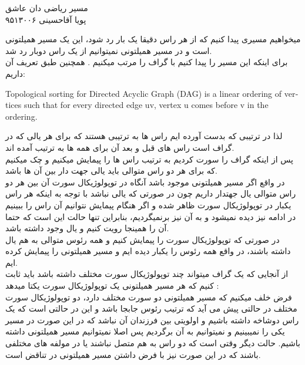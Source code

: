 \documentclass[11pt]{letter}
\begin{document}
	\begin{center}
		{\huge مسیر ریاضی دان عاشق}\\
		{ پویا آقاحسینی ۹۵۱۳۰۰۶}
	\end{center}
	\begin{RTL}
		میخواهیم مسیری پیدا کنیم که از هر راس دقیقا یک بار رد شود، این یک مسیر همیلتونی است و در مسیر همیلتونی نمیتوانیم از یک راس دوبار رد شد.\\
		برای اینکه این مسیر را پیدا کنیم با 
		گراف را مرتب میکنیم .
		همچنین طبق تعریف آن داریم:\\

\begin{latin}
				Topological sorting for Directed Acyclic Graph (DAG) is a linear ordering of vertices such that for every directed edge uv, vertex u comes before v in the ordering.
\end{latin}
		
	لذا در ترتیبی که بدست آورده ایم راس ها به ترتیبی هستند که برای هر یالی که در گراف است راس های قبل و بعد آن برای همه 
		ها به ترتیب آمده اند.\\
		پس از اینکه گراف را سورت کردیم به ترتیب راس ها را پیمایش میکنیم و چک میکنیم که برای هر دو راس متوالی باید یالی جهت دار بین آن ها باشد.\\
		
		 در واقع اگر مسیر همیلتونی موجود باشد آنگاه در توپولوژیکال سورت آن بین هر دو راس متوالی یال جهتدار داریم چون در صورتی که یالی نباشد با توجه به اینکه هر راس یکبار در توپولوژیکال سورت ظاهر شده و اگر هنگام پیمایش نتوانیم آن راس را ببینیم در ادامه نیز دیده نمیشود و به آن نیز برنمیگردیم، بنابراین تنها حالت این است که حتما آن را همینجا رویت کنیم و یال وجود داشته باشد. \\
		 در صورتی که توپولوژیکال سورت را پیمایش کنیم و همه رئوس متوالی به هم یال داشته باشند، در واقع همه رئوس را یکبار دیده ایم و مسیر همیلتونی را پیمایش کرده ایم.\\
		 از آنجایی که یک گراف میتواند چند توپولوژیکال سورت مختلف داشته باشد باید ثابت کنیم که هر مسیر همیلتونی یک توپولوژیکال سورت یکتا میدهد : \\
		فرض خلف میکنیم که مسیر همیلتونی دو سورت مختلف دارد، دو توپولوژیکال سورت مختلف در حالتی پیش می آید که ترتیب رئوس جابجا باشد و این در حالتی است که یک راس دوشاخه داشته باشیم و اولویتی بین فرزندان آن نباشد که در این صورت در مسیر یکی را نمیبینیم و نمیتوانیم به آن برگردیم پس اصلا نمیتوانیم مسیر همیلتونی داشته باشیم.
		حالت دیگر وقتی است که دو راس به هم متصل نباشند یا در مولفه های مختلفی باشند که در این صورت نیز با فرض داشتن مسیر همیلتونی در تناقض است.
				\end{RTL}
\end{document}
